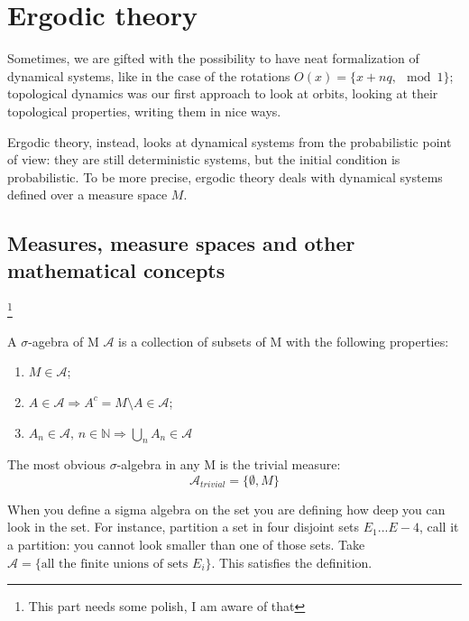 \chapter{Ergodic theory}

Sometimes, we are gifted with the possibility to have neat formalization of dynamical systems, like in the case of the rotations $O(x)=\{x+nq, \mod 1\}$; topological dynamics was our first approach to look at orbits, looking at their topological properties, writing them in nice ways. 

Ergodic theory, instead, looks at dynamical systems from the probabilistic point of view: they are still deterministic systems, but the initial condition is probabilistic. To be more precise, ergodic theory deals with dynamical systems defined over a measure space $M$.

\section{Measures, measure spaces and other mathematical concepts}
\footnote{This part needs some polish, I am aware of that}
\begin{definition}
    A $\sigma$-agebra of M $\mathcal{A}$ is a collection of subsets of M with the following properties: \begin{enumerate}
        \item $M\in\mathcal{A}$;
        \item $A\in\mathcal{A}\Rightarrow A^c=M\setminus A\in\mathcal{A}$;
        \item $A_n\in\mathcal{A},\,n\in\mathbb{N}\Rightarrow\bigcup_{n}A_n\in\mathcal{A}$
    \end{enumerate}
\end{definition}

\begin{example}
The most obvious $\sigma$-algebra in any M is the trivial measure: \begin{equation*}
    \mathcal{A}_{trivial}=\{\emptyset, M\}
\end{equation*}
\end{example}

When you define a sigma algebra on the set you are defining how deep you can look in the set. For instance, partition a set in four disjoint sets $E_1...E-4$, call it a partition: you cannot look smaller than one of those sets. Take $\mathcal{A}=\{\text{all the finite unions of sets }E_i\}$. This satisfies the definition.

